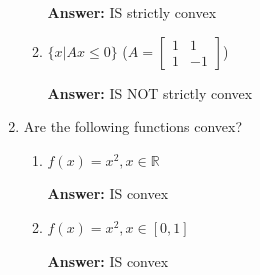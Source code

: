 \documentclass{assignment}
\newcommand{\R}{\mathbb{R}}
\begin{document}
\begin{problem}
\begin{enumerate}
\begin{enumerate}[label=(\alph*)]
        \color{blue}\textbf{Answer:} IS strictly convex\color{black}



        \item $\{x | Ax \leq 0\}$ ($A = \begin{bmatrix}
            1 & 1\\
            1 & -1
        \end{bmatrix}$)

        \color{blue}\textbf{Answer:} IS NOT strictly convex\color{black}


    \end{enumerate}

        
    \item Are the following functions convex?

    \begin{enumerate}[label=(\alph*)]


        
        \item $f(x) = x^2, x \in \R$

        \color{blue}\textbf{Answer:} IS convex\color{black}


        
        \item $f(x) = x^2, x \in [0,1]$

        \color{blue}\textbf{Answer:} IS convex\color{black}


        

\end{enumerate}
\end{enumerate}
\end{problem}
\end{document}
